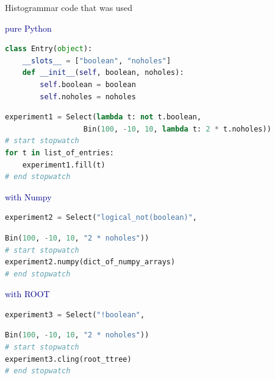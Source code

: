 \documentclass{beamer}
\begin{document}
\begin{frame}[fragile]{Histogrammar code that was used}
\vspace{0.3 cm}

\hfill \textcolor{darkblue}{pure Python}

\vspace{-0.5 cm}
\begin{minipage}{0.8\linewidth}
\begin{lstlisting}[language=python]
class Entry(object):
    __slots__ = ["boolean", "noholes"]
    def __init__(self, boolean, noholes):
        self.boolean = boolean
        self.noholes = noholes
\end{lstlisting}
\end{minipage}

\vspace{-0.25 cm}
\begin{minipage}{\linewidth}
\begin{lstlisting}[language=python]
experiment1 = Select(lambda t: not t.boolean,
                  Bin(100, -10, 10, lambda t: 2 * t.noholes))
# start stopwatch
for t in list_of_entries:
    experiment1.fill(t)
# end stopwatch
\end{lstlisting}
\end{minipage}

\hfill \textcolor{darkblue}{with Numpy}

\vspace{-0.5 cm}
\begin{minipage}{0.8\linewidth}
\begin{lstlisting}[language=python]
experiment2 = Select("logical_not(boolean)",
\end{lstlisting}
\end{minipage}

\vspace{-0.45 cm}
\begin{minipage}{\linewidth}
\begin{lstlisting}[language=python]
                  Bin(100, -10, 10, "2 * noholes"))
# start stopwatch
experiment2.numpy(dict_of_numpy_arrays)
# end stopwatch
\end{lstlisting}
\end{minipage}

\hfill \textcolor{darkblue}{with ROOT}

\vspace{-0.5 cm}
\begin{minipage}{0.8\linewidth}
\begin{lstlisting}[language=python]
experiment3 = Select("!boolean",
\end{lstlisting}
\end{minipage}

\vspace{-0.45 cm}
\begin{minipage}{\linewidth}
\begin{lstlisting}[language=python]
                  Bin(100, -10, 10, "2 * noholes"))
# start stopwatch
experiment3.cling(root_ttree)
# end stopwatch
\end{lstlisting}
\end{minipage}
\end{frame}
\end{document}
